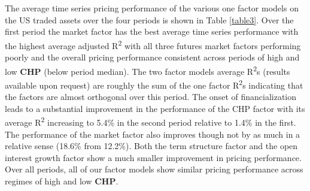 \documentclass[12pt,]{article}
\begin{document}
The average time series pricing performance of the various one factor
models on the US traded assets over the four periods is shown in Table
\ref{table3}. Over the first period the market factor has the best
average time series performance with the highest average adjusted
R\textsuperscript{2} with all three futures market factors performing
poorly and the overall pricing performance consistent across periods of
high and low \textbf{CHP} (below period median). The two factor models
average R\textsuperscript{2}s (results available upon request) are
roughly the sum of the one factor R\textsuperscript{2}s indicating that
the factors are almost orthogonal over this period. The onset of
financialization leads to a substantial improvement in the performance
of the CHP factor with its average R\textsuperscript{2} increasing to
5.4\% in the second period relative to 1.4\% in the first. The
performance of the market factor also improves though not by as much in
a relative sense (18.6\% from 12.2\%). Both the term structure factor
and the open interest growth factor show a much smaller improvement in
pricing performance. Over all periods, all of our factor models show
similar pricing performance across regimes of high and low \textbf{CHP}.
\end{document}
